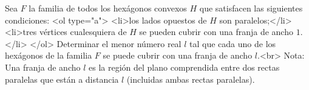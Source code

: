 Sea $F$ la familia de todos los hexágonos convexos $H$ que satisfacen las siguientes condiciones:
<ol type="a">
  <li>los lados opuestos de $H$ son paralelos;</li>
  <li>tres vértices cualesquiera de $H$ se pueden cubrir con una franja de ancho $1$.</li>
</ol>
Determinar el menor número real $l$ tal que cada uno de los hexágonos de la familia $F$ se puede cubrir con una franja de ancho $l$.<br>
Nota: Una franja de ancho $l$ es la región del plano comprendida entre dos rectas paralelas que están a distancia $l$ (incluidas ambas rectas paralelas).
